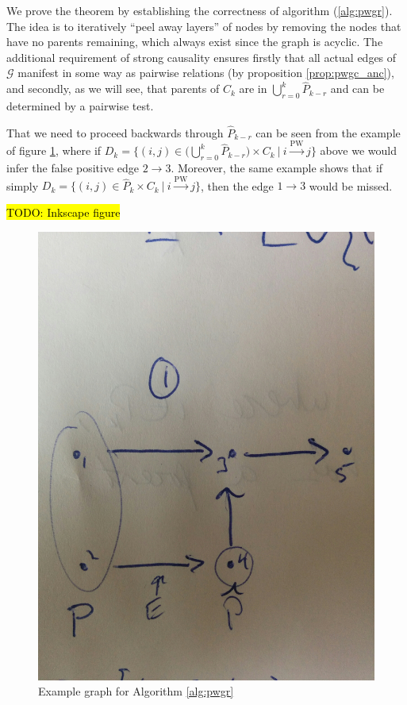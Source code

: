 \documentclass[12pt]{article}
\def\pwgc{\overset{\text{PW}}{\rightarrow}}  %
\def\gcg{\mathcal{G}}  %
\begin{document}
We prove the theorem by establishing the correctness of algorithm (\ref{alg:pwgr}).  The idea is to iteratively ``peel away layers'' of nodes by removing the nodes that have no parents remaining, which always exist since the graph is acyclic.  The additional requirement of strong causality ensures firstly that all actual edges of $\gcg$ manifest in some way as pairwise relations (by proposition \ref{prop:pwgc_anc}), and secondly, as we will see, that parents of $C_k$ are in $\bigcup_{r = 0}^k\widehat{P}_{k - r}$ and can be determined by a pairwise test.

\begin{example}
  That we need to proceed backwards through $\widehat{P}_{k - r}$ can be seen from the example of figure \ref{fig:example_fig3}, where if $D_k = \{(i, j) \in \Big(\bigcup_{r = 0}^k \widehat{P}_{k - r}\Big) \times C_k\ |\ i \pwgc j \}$ above we would infer the false positive edge $2 \rightarrow 3$.  Moreover, the same example shows that if simply $D_k = \{(i, j) \in \widehat{P}_k \times C_k\ |\ i \pwgc j \}$, then the edge $1 \rightarrow 3$ would be missed.

\hl{TODO: Inkscape figure}

  \begin{figure}
    \centering
    \label{fig:example_fig3}
    \caption{Example graph for Algorithm \ref{alg:pwgr}}
    \includegraphics[width=0.5\linewidth]{hand_drawn_example3.jpg}
  \end{figure}
\end{example}
\end{document}
